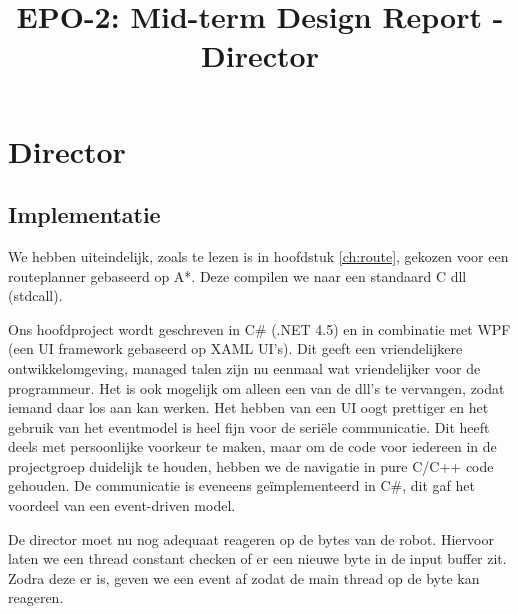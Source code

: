 \documentclass{report}
\title{EPO-2: Mid-term Design Report - Director}
\author{}
\begin{document}
\chapter{Director}
\label{ch:director}
\section{Implementatie}
\label{sec:dirImplementatie}
We hebben uiteindelijk, zoals te lezen is in hoofdstuk \ref{ch:route}, gekozen voor een routeplanner gebaseerd op A*. Deze compilen we naar een standaard C dll (stdcall).

Ons hoofdproject wordt geschreven in C\# (.NET 4.5) en in combinatie met WPF (een UI framework gebaseerd op XAML UI's).
Dit geeft een vriendelijkere ontwikkelomgeving, managed talen zijn nu eenmaal wat vriendelijker voor de programmeur.
Het is ook mogelijk om alleen een van de dll's te vervangen, zodat iemand daar los aan kan werken.
Het hebben van een UI oogt prettiger en het gebruik van het eventmodel is heel fijn voor de seriële communicatie.
Dit heeft deels met persoonlijke voorkeur te maken, maar om de code voor iedereen in de projectgroep duidelijk te houden, hebben we de navigatie in pure C/C++ code gehouden.
De communicatie is eveneens geïmplementeerd in C\#, dit gaf het voordeel van een event-driven model.

De director moet nu nog adequaat reageren op de bytes van de robot.
Hiervoor laten we een thread constant checken of er een nieuwe byte in de input buffer zit. Zodra deze er is, geven we een event af zodat de main thread op de byte kan reageren.
\end{document}
